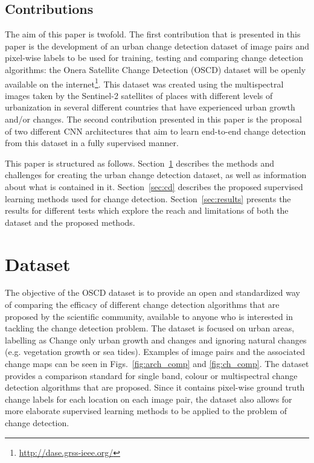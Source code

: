 \documentclass{article}
\begin{document}
\subsection{Contributions}
\label{ssec:contrib}

The aim of this paper is twofold. The first contribution that is presented in this paper is the development of an urban change detection dataset of image pairs and pixel-wise labels to be used for training, testing and comparing change detection algorithms: the Onera Satellite Change Detection (OSCD) dataset will be openly available on the internet\footnote{\url{http://dase.grss-ieee.org/}}. This dataset was created using the multispectral images taken by the Sentinel-2 satellites of places with different levels of urbanization in several different countries that have experienced urban growth and/or changes. The second contribution presented in this paper is the proposal of two different CNN architectures that aim to learn end-to-end change detection from this dataset in a fully supervised manner.

This paper is structured as follows. Section~\ref{sec:dataset} describes the methods and challenges for creating the urban change detection dataset, as well as information about what is contained in it. Section~\ref{sec:cd} describes the proposed supervised learning methods used for change detection. Section~\ref{sec:results} presents the results for different tests which explore the reach and limitations of both the dataset and the proposed methods. 


\section{Dataset}
\label{sec:dataset}



The objective of the OSCD dataset is to provide an open and standardized way of comparing the efficacy of different change detection algorithms that are proposed by the scientific community, available to anyone who is interested in tackling the change detection problem. The dataset is focused on urban areas, labelling as Change only urban growth and changes and ignoring natural changes (e.g. vegetation growth or sea tides). Examples of image pairs and the associated change maps can be seen in Figs.~\ref{fig:arch_comp} and \ref{fig:ch_comp}. The dataset provides a comparison standard for single band, colour or multispectral change detection algorithms that are proposed. Since it contains pixel-wise ground truth change labels for each location on each image pair, the dataset also allows for more elaborate supervised learning methods to be applied to the problem of change detection.
\end{document}
